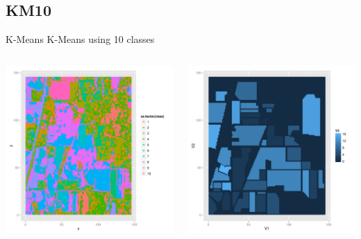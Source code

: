 \documentclass[11pt]{beamer}
\begin{document}
\subsection{KM10}
\begin{frame}{K-Means}
K-Means using 10 classes
\begin{columns}[T]
\begin{column}{.48\textwidth}
\includegraphics[scale=.3]{km10.png}
\end{column}
\hfill
\begin{column}{.48\textwidth}
\includegraphics[scale=.3]{gt.png}
\end{column}
\end{columns}
\end{frame}
\end{document}
